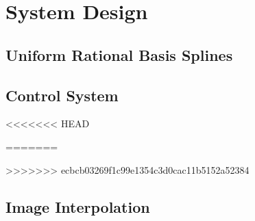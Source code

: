 \chapter{System Design}


\section{Uniform Rational Basis Splines}




\section{Control System}
<<<<<<< HEAD




=======


>>>>>>> ecbcb03269f1c99e1354c3d0cac11b5152a52384




\section{Image Interpolation}